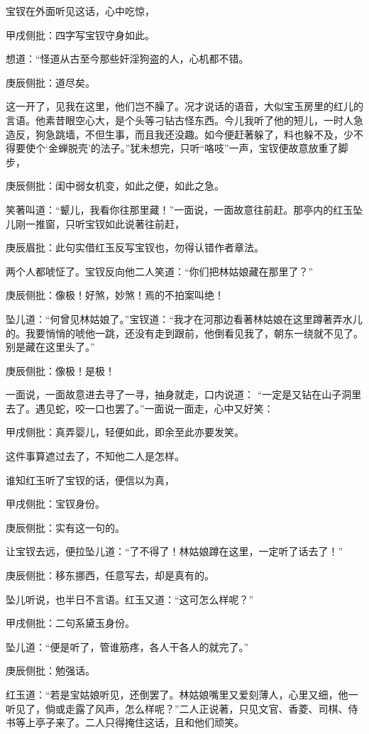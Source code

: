 \begin{parag}
    宝钗在外面听见这话，心中吃惊，\begin{note}甲戌侧批：四字写宝钗守身如此。\end{note}想道：“怪道从古至今那些奸淫狗盗的人，心机都不错。\begin{note}庚辰侧批：道尽矣。\end{note}这一开了，见我在这里，他们岂不臊了。况才说话的语音，大似宝玉房里的红儿的言语。他素昔眼空心大，是个头等刁钻古怪东西。今儿我听了他的短儿，一时人急造反，狗急跳墙，不但生事，而且我还没趣。如今便赶著躲了，料也躲不及，少不得要使个‘金蝉脱壳’的法子。”犹未想完，只听“咯吱”一声，宝钗便故意放重了脚步，\begin{note}庚辰侧批：闺中弱女机变，如此之便，如此之急。\end{note}笑著叫道：“颦儿，我看你往那里藏！”一面说，一面故意往前赶。那亭内的红玉坠儿刚一推窗，只听宝钗如此说著往前赶，\begin{note}庚辰眉批：此句实借红玉反写宝钗也，勿得认错作者章法。\end{note}两个人都唬怔了。宝钗反向他二人笑道：“你们把林姑娘藏在那里了？”\begin{note}庚辰侧批：像极！好煞，妙煞！焉的不拍案叫绝！\end{note}坠儿道：“何曾见林姑娘了。”宝钗道：“我才在河那边看著林姑娘在这里蹲著弄水儿的。我要悄悄的唬他一跳，还没有走到跟前，他倒看见我了，朝东一绕就不见了。别是藏在这里头了。”\begin{note}庚辰侧批：像极！是极！\end{note}一面说，一面故意进去寻了一寻，抽身就走，口内说道： “一定是又钻在山子洞里去了。遇见蛇，咬一口也罢了。”一面说一面走，心中又好笑：\begin{note}甲戌侧批：真弄婴儿，轻便如此，即余至此亦要发笑。\end{note}这件事算遮过去了，不知他二人是怎样。
\end{parag}


\begin{parag}
    谁知红玉听了宝钗的话，便信以为真，\begin{note}甲戌侧批：宝钗身份。\end{note}\begin{note}庚辰侧批：实有这一句的。\end{note}让宝钗去远，便拉坠儿道：“了不得了！林姑娘蹲在这里，一定听了话去了！”\begin{note}庚辰侧批：移东挪西，任意写去，却是真有的。\end{note}坠儿听说，也半日不言语。红玉又道：“这可怎么样呢？”\begin{note}甲戌侧批：二句系黛玉身份。\end{note}坠儿道：“便是听了，管谁筋疼，各人干各人的就完了。”\begin{note}庚辰侧批：勉强话。\end{note}红玉道：“若是宝姑娘听见，还倒罢了。林姑娘嘴里又爱刻薄人，心里又细，他一听见了，倘或走露了风声，怎么样呢？”二人正说著，只见文官、香菱、司棋、侍书等上亭子来了。二人只得掩住这话，且和他们顽笑。
\end{parag}


